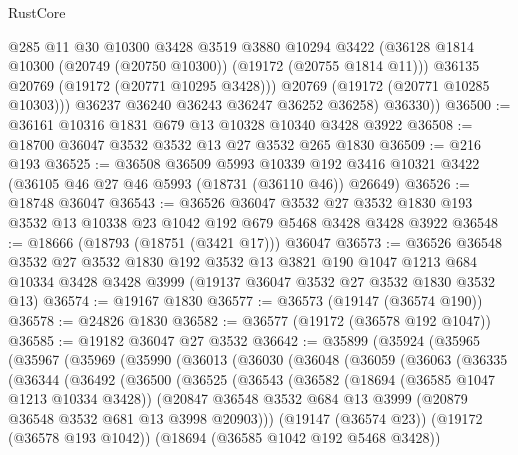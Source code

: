 \begin{lexlean}{RustCore}
\begin{coremodule}
              @285
              @11
              @30
              @10300
              @3428
              @3519
              @3880
              @10294
              @3422
              (@36128 @1814 @10300 (@20749 (@20750 @10300)) (@19172 (@20755 @1814 @11)))
              @36135
              @20769
              (@19172 (@20771 @10295 @3428)))
            @20769
            (@19172 (@20771 @10285 @10303)))
          @36237
          @36240
          @36243
          @36247
          @36252
          @36258)
        @36330))
@36500 := @36161 @10316 @1831 @679 @13 @10328 @10340 @3428 @3922
@36508 := @18700 @36047 @3532 @3532 @13 @27 @3532 @265 @1830
@36509 := @216 @193
@36525 := @36508
    @36509
    @5993
    @10339
    @192
    @3416
    @10321
    @3422
    (@36105 @46 @27 @46 @5993 (@18731 (@36110 @46)) @26649)
@36526 := @18748 @36047
@36543 := @36526
    @36047
    @3532
    @27
    @3532
    @1830
    @193
    @3532
    @13
    @10338
    @23
    @1042
    @192
    @679
    @5468
    @3428
    @3428
    @3922
@36548 := @18666 (@18793 (@18751 (@3421 @17))) @36047
@36573 := @36526
    @36548
    @3532
    @27
    @3532
    @1830
    @192
    @3532
    @13
    @3821
    @190
    @1047
    @1213
    @684
    @10334
    @3428
    @3428
    @3999
    (@19137 @36047 @3532 @27 @3532 @1830 @3532 @13)
@36574 := @19167 @1830
@36577 := @36573 (@19147 (@36574 @190))
@36578 := @24826 @1830
@36582 := @36577 (@19172 (@36578 @192 @1047))
@36585 := @19182 @36047 @27 @3532
@36642 := @35899
    (@35924
      (@35965
        (@35967
          (@35969
            (@35990
              (@36013
                (@36030
                  (@36048
                    (@36059
                      (@36063
                        (@36335
                          (@36344
                            (@36492
                              (@36500
                                (@36525
                                  (@36543
                                    (@36582
                                      (@18694 (@36585 @1047 @1213 @10334 @3428))
                                      (@20847
                                        @36548
                                        @3532
                                        @684
                                        @13
                                        @3999
                                        (@20879 @36548 @3532 @681 @13 @3998 @20903)))
                                    (@19147 (@36574 @23))
                                    (@19172 (@36578 @193 @1042))
                                    (@18694 (@36585 @1042 @192 @5468 @3428))

\end{coremodule}
\end{lexlean}
